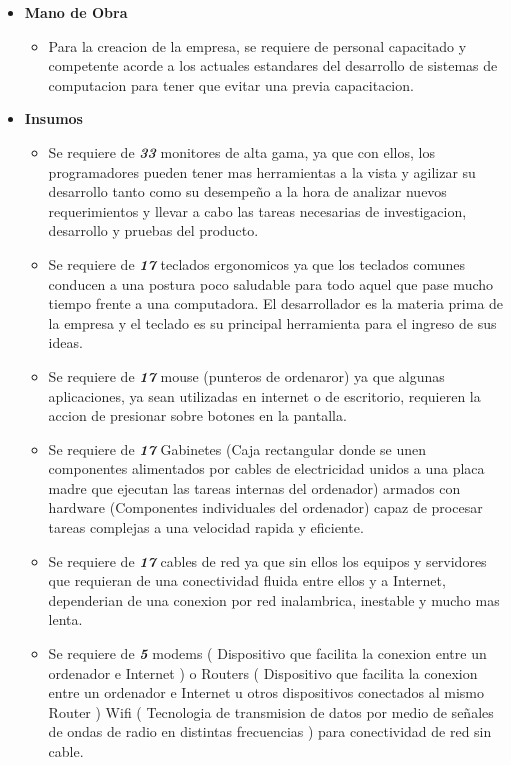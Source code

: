 \documentclass[
10pt, %
a4paper, %
oneside, %
headinclude,footinclude, %
BCOR5mm, %
]{scrartcl}
\begin{document}
\begin{itemize}
  \item \textbf {Mano de Obra}
  \begin{itemize}
    \item Para la creacion de la empresa, se requiere de personal capacitado y
            competente acorde a los actuales estandares del desarrollo de sistemas
            de computacion para tener que evitar una previa capacitacion.
  \end{itemize}

  \item \textbf {Insumos}
  \begin{itemize}
    \item Se requiere de \emph { \textbf{33} } monitores de alta gama,
            ya que con ellos, los programadores pueden tener mas herramientas
            a la vista y agilizar su desarrollo tanto como su desempeño a la
            hora de analizar nuevos requerimientos y llevar a cabo las tareas
            necesarias de investigacion, desarrollo y pruebas del producto.
    \item Se requiere de \emph { \textbf{17} } teclados ergonomicos
            ya que los teclados comunes conducen a una postura poco saludable
            para todo aquel que pase mucho tiempo frente a una computadora.
            El desarrollador es la materia prima de la empresa y el teclado
            es su principal herramienta para el ingreso de sus ideas.
    \item Se requiere de \emph { \textbf{17} } mouse (punteros de ordenaror)
            ya que algunas aplicaciones, ya sean utilizadas en internet o de
            escritorio, requieren la accion de presionar sobre botones en la
            pantalla.
    \item Se requiere de \emph { \textbf{17} } Gabinetes (Caja rectangular
              donde se unen componentes alimentados por cables de electricidad
              unidos a una placa madre que ejecutan las tareas internas del
              ordenador) armados con hardware (Componentes individuales del
              ordenador) capaz de procesar tareas complejas a una velocidad
              rapida y eficiente.
    \item Se requiere de \emph { \textbf{17} } cables de red ya que sin ellos
            los equipos y servidores que requieran de una conectividad
            fluida entre ellos y a Internet, dependerian de una conexion por
            red inalambrica, inestable y mucho mas lenta.
    \item Se requiere de \emph { \textbf{5} } modems ( Dispositivo
            que facilita la conexion entre un ordenador e Internet ) o
            Routers ( Dispositivo que facilita la conexion entre un
            ordenador e Internet u otros dispositivos conectados al mismo
            Router ) Wifi ( Tecnologia de transmision de datos por medio de
            señales de ondas de radio en distintas frecuencias ) para
            conectividad de red sin cable.
\pagebreak


\end{itemize}
\end{itemize}
\end{document}
